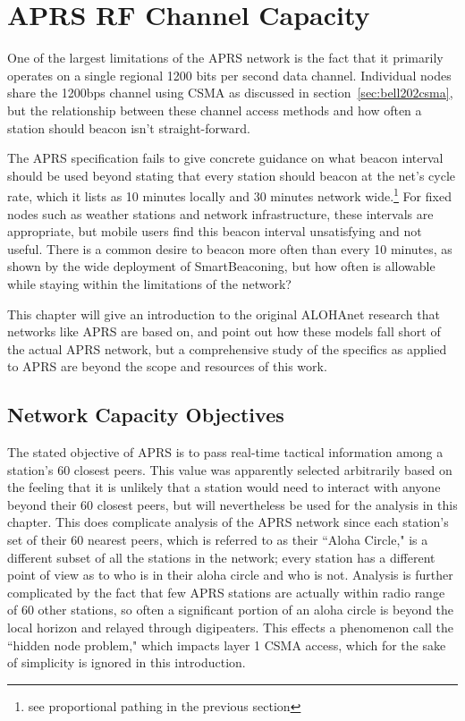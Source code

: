 \chapter{APRS RF Channel Capacity}
\label{chap:channelcapacity}

One of the largest limitations of the APRS network is the fact that it primarily operates
on a single regional 1200 bits per second data channel. 
Individual nodes share the 1200bps channel using 
CSMA as discussed in section~\ref{sec:bell202csma}, but the relationship between 
these channel access methods and how often a station should beacon isn't straight-forward.

The APRS specification fails to give concrete guidance on what beacon interval should
be used beyond stating that every station should beacon at the net's cycle rate,
which it lists as 10 minutes locally and 30 minutes 
network wide\cite[p.~9]{aprsspec}.\footnote{see proportional pathing in the previous section}
For fixed nodes such as weather stations and network infrastructure, 
these intervals are appropriate, but mobile users find this beacon interval unsatisfying
and not useful.
There is a common desire to beacon more often than every 10 minutes,
as shown by the wide deployment of SmartBeaconing,
but how often is allowable while staying within the limitations of the network?

This chapter will give an introduction to the original ALOHAnet research that networks like
APRS are based on, and point out how these models fall short of the actual APRS network,
but a comprehensive study of the specifics as applied to APRS are beyond
the scope and resources of this work.

\section{Network Capacity Objectives}

The stated objective of APRS is to pass real-time tactical information among a station's
60 closest peers.
This value was apparently selected arbitrarily based on the feeling that
it is unlikely that a station would need to interact with anyone beyond their 60
closest peers, but will nevertheless be used for the analysis in this chapter.
This does complicate analysis of the APRS network since each station's set of
their 60 nearest peers, which is referred to as their ``Aloha Circle,"
is a different subset of all the stations in the network;
every station has a different point of view as to who is in their aloha circle and who
is not.
Analysis is further complicated by the fact that few APRS stations are actually within
radio range of 60 other stations, so often a significant portion of an aloha circle is
beyond the local horizon and relayed through digipeaters.
This effects a phenomenon call the ``hidden node problem," which impacts
layer 1 CSMA access, which for the sake of simplicity is ignored in this introduction.

